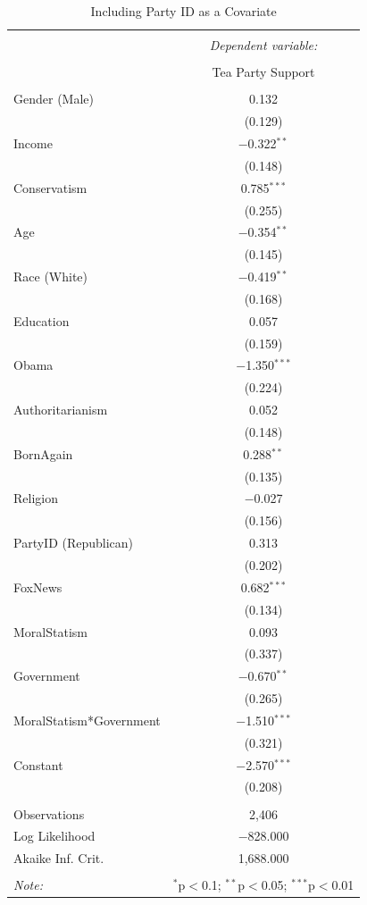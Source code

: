 \documentclass[12pt,]{article}
\begin{document}
\begin{table}[!htbp] \centering 
  \caption{Including Party ID as a Covariate} 
  \label{} 
\footnotesize 
\begin{tabular}{@{\extracolsep{5pt}}lc} 
\\[-1.8ex]\hline 
\hline \\[-1.8ex] 
 & \multicolumn{1}{c}{\textit{Dependent variable:}} \\ 
\cline{2-2} 
\\[-1.8ex] & Tea Party Support \\ 
\hline \\[-1.8ex] 
 Gender (Male) & 0.132 \\ 
  & (0.129) \\ 
  Income & $-$0.322$^{**}$ \\ 
  & (0.148) \\ 
  Conservatism & 0.785$^{***}$ \\ 
  & (0.255) \\ 
  Age & $-$0.354$^{**}$ \\ 
  & (0.145) \\ 
  Race (White) & $-$0.419$^{**}$ \\ 
  & (0.168) \\ 
  Education & 0.057 \\ 
  & (0.159) \\ 
  Obama & $-$1.350$^{***}$ \\ 
  & (0.224) \\ 
  Authoritarianism & 0.052 \\ 
  & (0.148) \\ 
  BornAgain & 0.288$^{**}$ \\ 
  & (0.135) \\ 
  Religion & $-$0.027 \\ 
  & (0.156) \\ 
  PartyID (Republican) & 0.313 \\ 
  & (0.202) \\ 
  FoxNews & 0.682$^{***}$ \\ 
  & (0.134) \\ 
  MoralStatism & 0.093 \\ 
  & (0.337) \\ 
  Government & $-$0.670$^{**}$ \\ 
  & (0.265) \\ 
  MoralStatism*Government & $-$1.510$^{***}$ \\ 
  & (0.321) \\ 
  Constant & $-$2.570$^{***}$ \\ 
  & (0.208) \\ 
 \hline \\[-1.8ex] 
Observations & 2,406 \\ 
Log Likelihood & $-$828.000 \\ 
Akaike Inf. Crit. & 1,688.000 \\ 
\hline 
\hline \\[-1.8ex] 
\textit{Note:}  & \multicolumn{1}{r}{$^{*}$p$<$0.1; $^{**}$p$<$0.05; $^{***}$p$<$0.01} \\ 
\end{tabular} 
\end{table}
\end{document}

